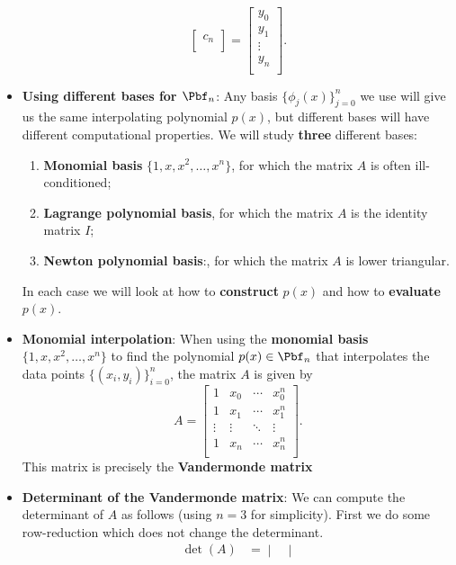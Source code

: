 \documentclass{report}
\begin{document}
\begin{itemize}
$$\begin{bmatrix}
c_n\\
\end{bmatrix}
=
\begin{bmatrix}
y_0\\
y_1\\
\vdots\\
y_n\\
\end{bmatrix}.
$$
\item \textbf{Using different bases for $\Pbf_n$}:
    Any basis $\big\{\phi_j(x)\big\}_{j=0}^n$ we use will give us the same interpolating polynomial $p(x)$, but different bases will have different computational properties.
    \bigbreak \noindent 
    We will study \textbf{three} different bases:
    \begin{enumerate}
        \item \textbf{Monomial basis} $\{1, x, x^2, \ldots, x^n\}$, for which the matrix $A$ is often ill-conditioned;
        \item \textbf{Lagrange polynomial basis}, for which the matrix $A$ is the identity matrix $I$;
        \item \textbf{Newton polynomial basis}:, for which the matrix $A$ is lower triangular.
    \end{enumerate}
    In each case we will look at how to \textbf{construct} $p(x)$ and how to \textbf{evaluate} $p(x)$.
\item \textbf{Monomial interpolation}:
    When using the \textbf{monomial basis} $\{1, x, x^2, \ldots, x^n\}$ to find the polynomial $p(x) \in \Pbf_n$ that interpolates the data points $\{(x_i,y_i)\}_{i=0}^n$, the matrix $A$ is given by
    $$
    A = 
    \begin{bmatrix}
        1 & x_0 & \cdots & x_0^n\\
        1 & x_1 & \cdots & x_1^n\\
        \vdots & \vdots & \ddots & \vdots\\
        1 & x_n & \cdots & x_n^n\\
    \end{bmatrix}.
    $$
    \bigbreak \noindent 
    This matrix is precisely the \textbf{Vandermonde matrix}
\item \textbf{Determinant of the Vandermonde matrix}:
    We can compute the determinant of $A$ as follows (using $n=3$ for simplicity).
    \bigbreak \noindent 
    First we do some row-reduction which does not change the determinant.
    $$
    \begin{align}
        \det(A)
& = 
\begin{vmatrix}

\end{vmatrix}
\end{align}$$
\end{itemize}
\end{document}
